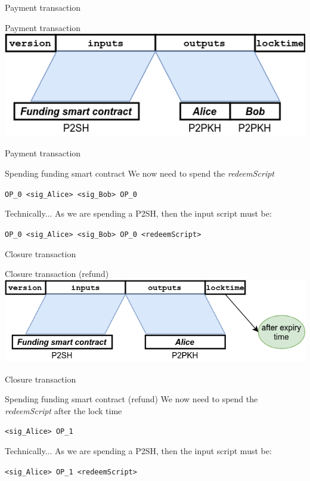 \documentclass{beamer}
\begin{document}
\begin{frame}{Payment transaction}
 \begin{exampleblock}{Payment transaction}
  \includegraphics[width=\textwidth, height=0.8\textheight, keepaspectratio]{img/unidir_tx_payment.png}
 \end{exampleblock}
\end{frame}
\begin{frame}{Payment transaction}
 \begin{exampleblock}{Spending funding smart contract}
  We now need to spend the \textit{redeemScript}
  \begin{center}
   \texttt{OP\_0 <sig\_Alice> <sig\_Bob> OP\_0}
  \end{center}
 \end{exampleblock}
 \begin{exampleblock}{Technically...}
  As we are spending a P2SH, then the input script must be:\
  \begin{center}
   \texttt{OP\_0 <sig\_Alice> <sig\_Bob> OP\_0 <redeemScript>}
  \end{center}
 \end{exampleblock}
\end{frame}
\begin{frame}{Closure transaction}
 \begin{exampleblock}{Closure transaction (refund)}
  \includegraphics[width=\textwidth, height=0.8\textheight, keepaspectratio]{img/unidir_tx_refund.png}
 \end{exampleblock}
\end{frame}
\begin{frame}{Closure transaction}
 \begin{exampleblock}{Spending funding smart contract (refund)}
  We now need to spend the \textit{redeemScript} after the lock time
  \begin{center}
   \texttt{<sig\_Alice> OP\_1}
  \end{center}
 \end{exampleblock}
 \begin{exampleblock}{Technically...}
  As we are spending a P2SH, then the input script must be:\
  \begin{center}
   \texttt{<sig\_Alice> OP\_1 <redeemScript>}
  \end{center}
 \end{exampleblock}
\end{frame}
\end{document}
